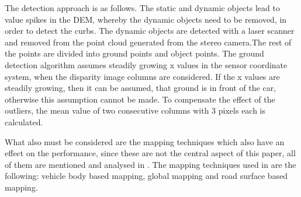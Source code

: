 \documentclass[conference]{IEEEtran}
\begin{document}
The detection approach is as follows. The static and dynamic objects lead to value spikes in the DEM, whereby the dynamic objects need to be removed, in order to detect the curbs. The dynamic objects are detected with a laser scanner and removed from the point cloud generated from the stereo camera.The rest of the points are divided into ground points and object points. The ground detection algorithm assumes steadily growing x values in the sensor coordinate system, when the disparity image columns are considered. If the x values are steadily growing, then it can be assumed, that ground is in front of the car, otherwise this assumption cannot be made. To compensate the effect of the outliers, the mean value of two consecutive columns with 3 pixels each is calculated.

What also must be considered are the mapping techniques which also have an effect on the performance, since these are not the central aspect of this paper, all of them are mentioned and analysed in \cite{stereo}. The mapping techniques used in \cite{stereo} are the following: vehicle body based mapping, global mapping and road surface based mapping. 
\end{document}
